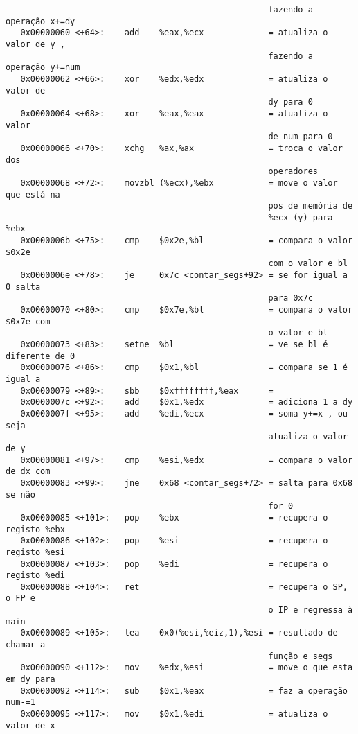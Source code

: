 \documentclass[a4paper, 12pt, portuguese]{article}
\begin{document}
\begin{verbatim}
                                                     fazendo a operação x+=dy
   0x00000060 <+64>:	add    %eax,%ecx             = atualiza o valor de y ,
                                                     fazendo a operação y+=num
   0x00000062 <+66>:	xor    %edx,%edx             = atualiza o valor de
                                                     dy para 0
   0x00000064 <+68>:	xor    %eax,%eax             = atualiza o valor
                                                     de num para 0
   0x00000066 <+70>:	xchg   %ax,%ax               = troca o valor dos
                                                     operadores
   0x00000068 <+72>:	movzbl (%ecx),%ebx           = move o valor que está na
                                                     pos de memória de
                                                     %ecx (y) para %ebx
   0x0000006b <+75>:	cmp    $0x2e,%bl             = compara o valor $0x2e
                                                     com o valor e bl
   0x0000006e <+78>:	je     0x7c <contar_segs+92> = se for igual a 0 salta
                                                     para 0x7c
   0x00000070 <+80>:	cmp    $0x7e,%bl             = compara o valor $0x7e com
                                                     o valor e bl
   0x00000073 <+83>:	setne  %bl                   = ve se bl é diferente de 0
   0x00000076 <+86>:	cmp    $0x1,%bl              = compara se 1 é igual a
   0x00000079 <+89>:	sbb    $0xffffffff,%eax      =
   0x0000007c <+92>:	add    $0x1,%edx             = adiciona 1 a dy
   0x0000007f <+95>:	add    %edi,%ecx             = soma y+=x , ou seja
                                                     atualiza o valor de y
   0x00000081 <+97>:	cmp    %esi,%edx             = compara o valor de dx com
   0x00000083 <+99>:	jne    0x68 <contar_segs+72> = salta para 0x68 se não
                                                     for 0
   0x00000085 <+101>:	pop    %ebx                  = recupera o registo %ebx
   0x00000086 <+102>:	pop    %esi                  = recupera o registo %esi
   0x00000087 <+103>:	pop    %edi                  = recupera o registo %edi
   0x00000088 <+104>:	ret                          = recupera o SP, o FP e
                                                     o IP e regressa à main
   0x00000089 <+105>:	lea    0x0(%esi,%eiz,1),%esi = resultado de chamar a
                                                     função e_segs
   0x00000090 <+112>:	mov    %edx,%esi             = move o que esta em dy para
   0x00000092 <+114>:	sub    $0x1,%eax             = faz a operação num-=1
   0x00000095 <+117>:	mov    $0x1,%edi             = atualiza o valor de x

\end{verbatim}
\end{document}
